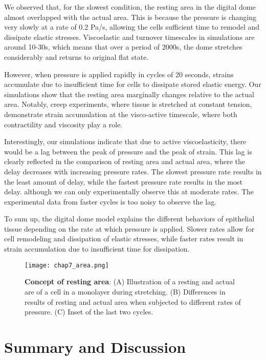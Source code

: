 We observed that, for the slowest condition, the resting area in the digital dome almost overlapped with the actual area. This is because the pressure is changing very slowly at a rate of 0.2 Pa/s, allowing the cells sufficient time to remodel and dissipate elastic stresses. Viscoelastic and turnover timescales in simulations are around 10-30s, which means that over a period of 2000s, the dome stretches considerably and returns to original flat state.

However, when pressure is applied rapidly in cycles of 20 seconds, strains accumulate due to insufficient time for cells to dissipate stored elastic energy. Our simulations show that the resting area marginally changes relative to the actual area. Notably, creep experiments, where tissue is stretched at constant tension, demonstrate strain accumulation at the visco-active timescale, where both contractility and viscosity play a role. 

Interestingly, our simulations indicate that due to active viscoelasticity, there would be a lag between the peak of pressure and the peak of strain. This lag is clearly reflected in the comparison of resting area and actual area, where the delay decreases with increasing pressure rates. The slowest pressure rate results in the least amount of delay, while the fastest pressure rate results in the most delay. although we can only experimentally observe this at moderate rates. The experimental data from faster cycles is too noisy to observe the lag.

To sum up, the digital dome model explains the different behaviors of epithelial tissue depending on the rate at which pressure is applied. Slower rates allow for cell remodeling and dissipation of elastic stresses, while faster rates result in strain accumulation due to insufficient time for dissipation.

\begin{figure}
	\centering
	\texttt{[image: chap7\_area.png]}
	\caption{\label{fig_7_8} \textbf{Concept of resting area}: (A) Illustration of a resting and actual are of a cell in a monolayer during stretching. (B) Differences in results of resting and actual area when subjected to different rates of pressure. (C) Inset of the last two cycles.
	}
\end{figure}

\newpage
\hypertarget{summary}{%
	\section{Summary and Discussion}\label{summary}}

